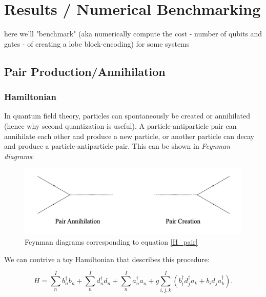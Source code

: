 \section{Results / Numerical Benchmarking}
\label{sec:results}

here we'll "benchmark" (aka numerically compute the cost - number of qubits and gates - of creating a lobe block-encoding) for some systems

%
%
%

\subsection{Pair Production/Annihilation}
\subsubsection{Hamiltonian}
In quantum field theory, particles can spontaneously be created or annihilated (hence why second quantization is useful). A particle-antiparticle pair can annihilate each other and produce a new particle, or another particle can decay and produce a particle-antiparticle pair. This can be shown in \emph{Feynman diagrams}:

\begin{figure}[h]
    \includegraphics[width = 0.7\linewidth]{figures/creation_annihilate.png}
    \caption{Feynman diagrams corresponding to equation \ref{H_pair}}
\end{figure}


We can contrive a toy Hamiltonian that describes this procedure:

\begin{equation}
    \label{H_pair}
    H = \sum_n^{I} b_n^\dagger b_n + \sum_n^{I} d_n^\dagger d_n + \sum_n^{I} a_n^\dagger a_n + g\sum_{i,j,k}^{I} \left(b_i^\dagger d_j^\dagger a_k + b_i d_j a_k^\dagger \right).
\end{equation}

